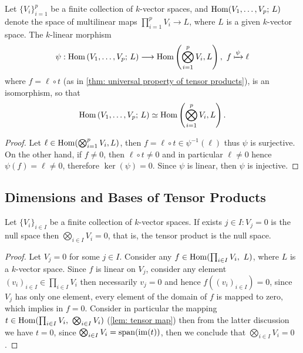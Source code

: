 \begin{corollary}
  \label{cor: multilinear maps are isomorphic to linear maps}
  Let \(\{V_i\}_{i=1}^p\) be a finite collection of \(k\)-vector spaces, and
  \(\operatorname{Hom}(V_1, \dots, V_p;\, L)\) denote the space of multilinear maps
  \(\prod_{i=1}^p V_i \to L\), where \(L\) is a given \(k\)-vector space. The
  \(k\)-linear morphism
  \[
    \psi :
    \operatorname{Hom}\left(V_1, \dots, V_p;\, L\right) \longrightarrow
    \operatorname{Hom}\left( \bigotimes_{i=1}^p V_i, L \right),\
    f \xmapsto \psi \ell
  \]
  where \(f = \ell \circ t\) (as in \cref{thm: universal property of tensor
  products}), is an isomorphism, so that
  \[
    \operatorname{Hom}\left(V_1, \dots, V_p;\, L\right) \simeq
    \operatorname{Hom}\left( \bigotimes_{i=1}^p V_i, L \right).
  \]
\end{corollary}

\begin{proof}
  Let \(\ell \in \operatorname{Hom}(\bigotimes_{i=1}^p V_i, L)\), then \(f = \ell \circ t
  \in \psi^{-1}(\ell)\) thus \(\psi\) is surjective. On the other hand, if
  \(f \neq 0\), then \(\ell \circ t \neq 0\) and in particular \(\ell \neq 0\)
  hence \(\psi(f) = \ell \neq 0\), therefore \(\ker(\psi) = 0\). Since \(\psi\)
  is linear, then \(\psi\) is injective.
\end{proof}

\subsection{Dimensions and Bases of Tensor Products}

\begin{proposition}
  Let \(\{V_i\}_{i \in I}\) be a finite collection of \(k\)-vector spaces. If
  exists \(j \in I : V_j = 0\) is the null space then \(\bigotimes_{i \in I}
  V_i = 0\), that is, the tensor product is the null space.
\end{proposition}

\begin{proof}
  Let \(V_j = 0\) for some \(j \in I\). Consider any \(f \in \operatorname{Hom}(\prod_{i
  \in I} V_i,\ L)\), where \(L\) is a \(k\)-vector space. Since \(f\) is linear
  on \(V_j\), consider any element \((v_i)_{i \in I} \in \prod_{i \in I} V_i\)
  then necessarily \(v_j = 0\) and hence \(f((v_i)_{i \in I}) = 0\), since
  \(V_j\) has only one element, every element of the domain of \(f\) is mapped
  to zero, which implies in \(f = 0\). Consider in particular the mapping \(t
  \in \operatorname{Hom}(\prod_{i \in I} V_i ,\ \bigotimes_{i \in I} V_i)\) (\cref{lem: tensor
  map}) then from the latter discussion we have \(t = 0\), since \(\bigotimes_{i
  \in I} V_i = \mathrm{span}(\operatorname{im}(t))\), then we conclude that \(\bigotimes_{i
  \in I} V_i = 0\).
\end{proof}

